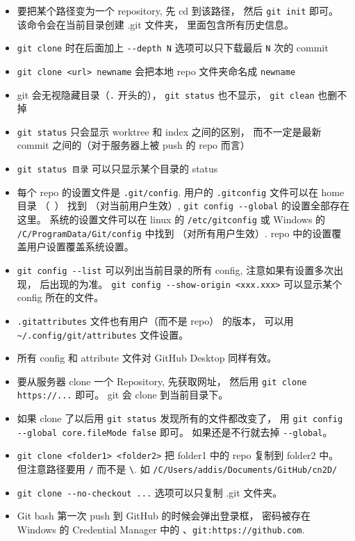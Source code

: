 \begin{itemize}
\item 要把某个路径变为一个 repository, 先 cd 到该路径， 然后 \verb|git init| 即可。 该命令会在当前目录创建 .git 文件夹， 里面包含所有历史信息。
\item \verb|git clone| 时在后面加上 \verb|--depth N| 选项可以只下载最后 \verb|N| 次的 commit
\item \verb|git clone <url> newname| 会把本地 repo 文件夹命名成 \verb|newname|
\item git 会无视隐藏目录（\verb|.| 开头的）， \verb|git status| 也不显示， \verb|git clean| 也删不掉
\item \verb|git status| 只会显示 worktree 和 index 之间的区别， 而不一定是最新 commit 之间的（对于服务器上被 push 的 repo 而言）
\item \verb|git status 目录| 可以只显示某个目录的 status
\item 每个 repo 的设置文件是 \verb|.git/config|. 用户的 \verb|.gitconfig| 文件可以在 home 目录 （~） 找到 （对当前用户生效）, \verb|git config --global| 的设置全部存在这里。 系统的设置文件可以在 linux 的 \verb|/etc/gitconfig| 或 Windows 的 \verb|/C/ProgramData/Git/config| 中找到 （对所有用户生效）. repo 中的设置覆盖用户设置覆盖系统设置。
\item \verb|git config --list| 可以列出当前目录的所有 config, 注意如果有设置多次出现， 后出现的为准。 \verb|git config --show-origin <xxx.xxx>| 可以显示某个 config 所在的文件。
\item \verb|.gitattributes| 文件也有用户（而不是 repo） 的版本， 可以用 \verb|~/.config/git/attributes| 文件设置。
\item 所有 config 和 attribute 文件对 GitHub Desktop 同样有效。
\item 要从服务器 clone 一个 Repository, 先获取网址， 然后用 \verb|git clone https://...| 即可。 git 会 clone 到当前目录下。
\item 如果 clone 了以后用 \verb|git status| 发现所有的文件都改变了， 用 \verb|git config --global core.fileMode false| 即可。 如果还是不行就去掉 \verb|--global|。
\item \verb|git clone <folder1> <folder2>| 把 folder1 中的 repo 复制到 folder2 中。 但注意路径要用 \verb|/| 而不是 \verb|\|. 如 \verb|/C/Users/addis/Documents/GitHub/cn2D/|
\item \verb|git clone --no-checkout ...| 选项可以只复制 .git 文件夹。
\item Git bash 第一次 push 到 GitHub 的时候会弹出登录框， 密码被存在 Windows 的 Credential Manager 中的 、\verb|git:https://github.com|.

\end{itemize}
